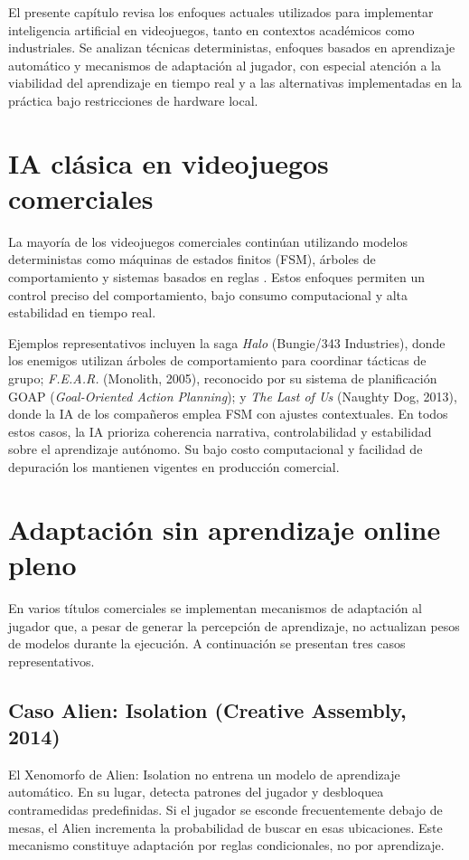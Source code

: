 El presente capítulo revisa los enfoques actuales utilizados para implementar inteligencia artificial en videojuegos, tanto en contextos académicos como industriales. Se analizan técnicas deterministas, enfoques basados en aprendizaje automático y mecanismos de adaptación al jugador, con especial atención a la viabilidad del aprendizaje en tiempo real y a las alternativas implementadas en la práctica bajo restricciones de hardware local.

\section{IA clásica en videojuegos comerciales}

La mayoría de los videojuegos comerciales continúan utilizando modelos deterministas como máquinas de estados finitos (FSM), árboles de comportamiento y sistemas basados en reglas \cite{yannakakis2018ai}. Estos enfoques permiten un control preciso del comportamiento, bajo consumo computacional y alta estabilidad en tiempo real.

Ejemplos representativos incluyen la saga \textit{Halo} (Bungie/343 Industries), donde los enemigos utilizan árboles de comportamiento para coordinar tácticas de grupo; \textit{F.E.A.R.} (Monolith, 2005), reconocido por su sistema de planificación GOAP (\textit{Goal-Oriented Action Planning}); y \textit{The Last of Us} (Naughty Dog, 2013), donde la IA de los compañeros emplea FSM con ajustes contextuales. En todos estos casos, la IA prioriza coherencia narrativa, controlabilidad y estabilidad sobre el aprendizaje autónomo. Su bajo costo computacional y facilidad de depuración los mantienen vigentes en producción comercial.

\section{Adaptación sin aprendizaje online pleno}

En varios títulos comerciales se implementan mecanismos de adaptación al jugador que, a pesar de generar la percepción de aprendizaje, no actualizan pesos de modelos durante la ejecución. A continuación se presentan tres casos representativos.

\subsection{Caso Alien: Isolation (Creative Assembly, 2014)}

El Xenomorfo de Alien: Isolation no entrena un modelo de aprendizaje automático. En su lugar, detecta patrones del jugador y desbloquea contramedidas predefinidas. Si el jugador se esconde frecuentemente debajo de mesas, el Alien incrementa la probabilidad de buscar en esas ubicaciones. Este mecanismo constituye adaptación por reglas condicionales, no por aprendizaje.

